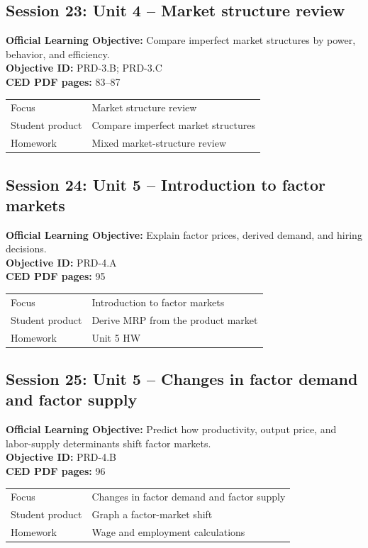 \documentclass[11pt,a4paper]{article}
\newcommand{\objectivebox}[1]{\noindent\colorbox{aplight}{\parbox{0.96\textwidth}{#1}}}
\begin{document}
\subsection{Session 23: Unit 4 -- Market structure review}
\objectivebox{\textbf{Official Learning Objective:} Compare imperfect market structures by power, behavior, and efficiency.\\\textbf{Objective ID:} PRD-3.B; PRD-3.C\\\textbf{CED PDF pages:} 83–87}\par\vspace{0.4em}
\begin{tabularx}{\textwidth}{p{3.0cm}Y}
\toprule
Focus & Market structure review\\
Student product & Compare imperfect market structures\\
Homework & Mixed market-structure review\\
\bottomrule
\end{tabularx}
\subsection{Session 24: Unit 5 -- Introduction to factor markets}
\objectivebox{\textbf{Official Learning Objective:} Explain factor prices, derived demand, and hiring decisions.\\\textbf{Objective ID:} PRD-4.A\\\textbf{CED PDF pages:} 95}\par\vspace{0.4em}
\begin{tabularx}{\textwidth}{p{3.0cm}Y}
\toprule
Focus & Introduction to factor markets\\
Student product & Derive MRP from the product market\\
Homework & Unit 5 HW\\
\bottomrule
\end{tabularx}
\newpage
\subsection{Session 25: Unit 5 -- Changes in factor demand and factor supply}
\objectivebox{\textbf{Official Learning Objective:} Predict how productivity, output price, and labor-supply determinants shift factor markets.\\\textbf{Objective ID:} PRD-4.B\\\textbf{CED PDF pages:} 96}\par\vspace{0.4em}
\begin{tabularx}{\textwidth}{p{3.0cm}Y}
\toprule
Focus & Changes in factor demand and factor supply\\
Student product & Graph a factor-market shift\\
Homework & Wage and employment calculations\\
\bottomrule
\end{tabularx}
\end{document}
